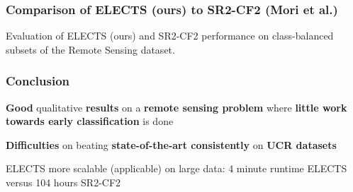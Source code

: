 \begin{frame}
	\frametitle{Comparison of ELECTS (ours) to SR2-CF2 (Mori et al.)}
	
	{Evaluation of ELECTS (ours) and SR2-CF2 performance on class-balanced subsets of the Remote Sensing dataset.}
\end{frame}

\begin{frame}
	\frametitle{Conclusion}
	
	\begin{description}
		\setlength\itemsep{2em}
		\item[Remote Sensing] \textbf{Good} qualitative \textbf{results} on a \textbf{remote sensing problem} where \textbf{little work towards early classification} is done
		\item[Time Series Classification] \textbf{Difficulties} on beating\textbf{ state-of-the-art consistently} on \textbf{UCR datasets}
		\item[Runtime] ELECTS more scalable (applicable) on large data: 4 minute runtime ELECTS versus 104 hours SR2-CF2
	\end{description}
	
\end{frame}

{
	\begin{frame}[plain]
		\vfill
		\begin{center}
			\Huge\color{tumwhite}
		\end{center}
		
		
		
		\vfill
	\end{frame}
}




